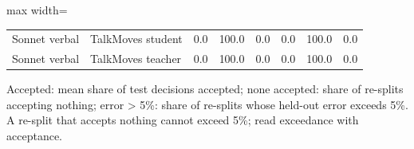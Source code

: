 \begin{table}[t]
\begin{adjustbox}{max width=\linewidth}
\begin{tabular}{llrrrrrr}
Sonnet verbal & TalkMoves student & 0.0 & 100.0 & 0.0 & 0.0 & 100.0 & 0.0 \\
Sonnet verbal & TalkMoves teacher & 0.0 & 100.0 & 0.0 & 0.0 & 100.0 & 0.0 \\
\bottomrule
\end{tabular}
\end{adjustbox}
\par\smallskip\footnotesize\raggedright Accepted: mean share of test decisions accepted; none accepted: share of re-splits accepting nothing; error > 5\%: share of re-splits whose held-out error exceeds 5\%. A re-split that accepts nothing cannot exceed 5\%; read exceedance with acceptance.
\end{table}
